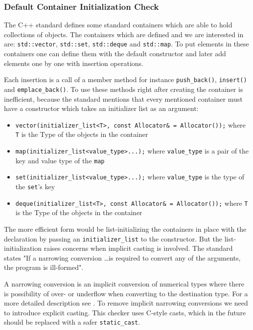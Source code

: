\subsubsection{Default Container Initialization Check}
\par The C++ standard defines some standard containers which are able to hold collections of objects. The containers which are defined and we are interested in are: \verb|std::vector|, \verb|std::set|, \verb|std::deque| and \verb|std::map|. To put elements in these containers one can define them with the default constructor and later add elements one by one with insertion operations. \medskip
\par Each insertion is a call of a member method for instance \verb|push_back()|, \verb|insert()| and \verb|emplace_back()|. To use these methods right after creating the container is inefficient, because the standard mentions that every mentioned container must have a constructor which takes an initializer list as an argument:
\begin{itemize}
	\item \verb|vector(initializer_list<T>, const Allocator& = Allocator());| where \verb|T| is the Type of the objects in the container \cite[\S23.3.6.2]{cpp_standard}
	\item \verb|map(initializer_list<value_type>...);| where \verb|value_type| is a pair of the key and value type of the \verb|map| \cite[\S23.4.4.2]{cpp_standard}
	\item \verb|set(initializer_list<value_type>...);| where \verb|value_type| is the type of the \verb|set|'s key \cite[\S23.4.6.2]{cpp_standard}
	\item \verb|deque(initializer_list<T>, const Allocator& = Allocator());| where \verb|T| is the Type of the objects in the container\cite[\S23.3.3.2]{cpp_standard}
\end{itemize}
\par The more efficient form would be list-initializing the containers in place with the declaration by passing an \verb|initializer_list| to the constructor. But the list-initialization raises concerns when implicit casting is involved. The standard states "If a narrowing conversion \dots is required to convert any of the arguments, the program is ill-formed"\cite[\S8.5.4 3.6]{cpp_standard}. \medskip
\par A narrowing conversion is an implicit conversion of numerical types where there is possibility of over- or underflow when converting to the destination type. For a more detailed description see \cite[\S8.5.4 7]{cpp_standard}. To remove implicit narrowing conversions we need to introduce explicit casting. This checker uses C-style casts, which in the future should be replaced with a safer \verb|static_cast|.
